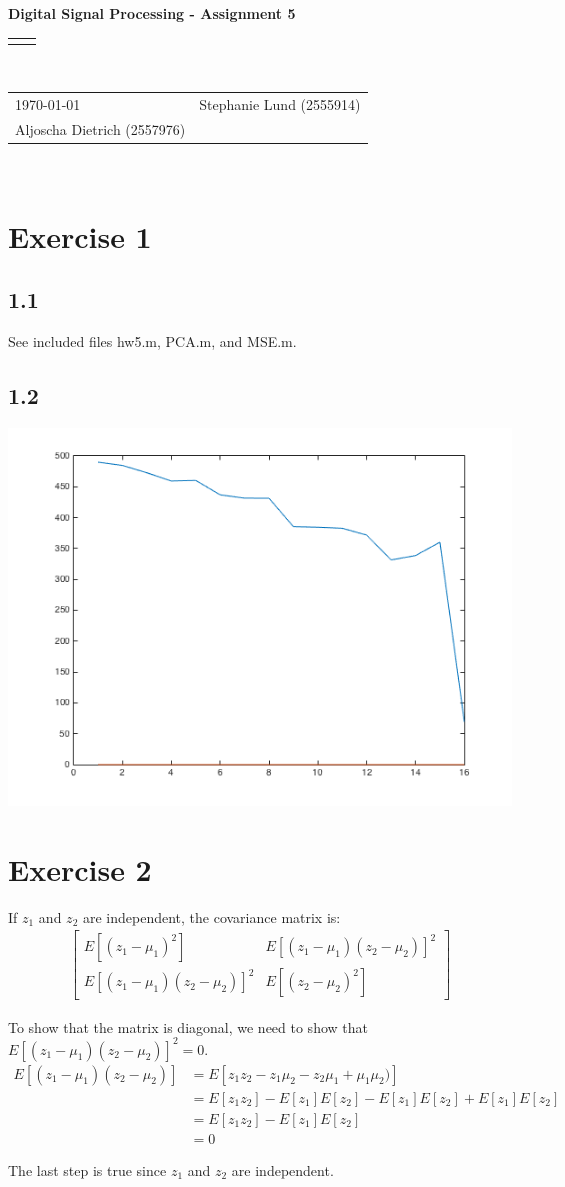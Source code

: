 \documentclass[12pt]{article}
\renewcommand{\title}[1]{\textbf{#1}\\}
\renewcommand{\line}{\begin{tabularx}{\textwidth}{X>{\raggedleft}X}\hline\\\end{tabularx}\\[-0.5cm]}
\newcommand{\leftright}[2]{\begin{tabularx}{\textwidth}{X>{\raggedleft}X}#1%
& #2\\\end{tabularx}\\[-0.5cm]}
\begin{document}
\title{Digital Signal Processing - Assignment 5}
\line
\leftright{\today}{Stephanie Lund (2555914)\\Aljoscha Dietrich (2557976)} %

\section*{Exercise 1}

\subsection*{1.1}
See included files hw5.m, PCA.m, and MSE.m.

\subsection*{1.2}
\includegraphics[scale=0.8]{hw5-1.png}

\section*{Exercise 2}
If $z_1$ and $z_2$ are independent, the covariance matrix is:
\begin{align*}
\begin{bmatrix}
E[(z_1 - \mu_1)^2] & E[(z_1 - \mu_1)(z_2 - \mu_2)]^2 \\
E[(z_1 - \mu_1)(z_2 - \mu_2)]^2 & E[(z_2 - \mu_2)^2] 
\end{bmatrix}
\end{align*}

To show that the matrix is diagonal, we need to show that $E[(z_1 - \mu_1)(z_2 - \mu_2)]^2 = 0$.
\begin{align*}
E[(z_1 - \mu_1)(z_2 - \mu_2)] &= E[z_1 z_2 - z_1 \mu_2 - z_2 \mu_1 + \mu_1 \mu_2)]\\
&= E[z_1 z_2] - E[z_1]E[z_2] - E[z_1]E[z_2] + E[z_1]E[z_2] \\
&= E[z_1 z_2] - E[z_1]E[z_2] \\
&= 0
\end{align*}

The last step is true since $z_1$ and $z_2$ are independent.\\
\end{document}
